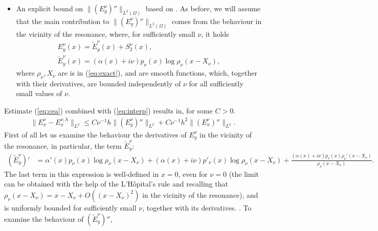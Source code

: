 \begin{itemize}
\item An explicit bound on $\|\left(E_{y}^{\nu}\right)''\|_{L^{2}(\Omega)}$ based on \cite{singular_solutions}. As before, we 
will assume that the main contribution to $\|\left(E_{y}^{\nu}\right)''\|_{L^{2}(\Omega)}$ comes from the behaviour in the vicinity of the resonance, where,
for sufficiently small $\nu$, it holds \cite[Proposition 1]{singular_solutions}
\begin{align*}
E_{y}^{\nu}(x)=\tilde{E}_{y}^{\nu}(x)+S^{\nu}_2(x), \\
\tilde{E}_{y}^{\nu}(x)=(\alpha(x)+i\nu)p_{\nu}(x)\log\rho_{\nu}(x-X_{\nu}),%
\end{align*}
where $\rho_{\nu},X_{\nu}$ are is in (\ref{eq:exact}), 
and  are smooth functions, which, together with their derivatives, are bounded independently of $\nu$ 
for all sufficiently small values of $\nu$.
\end{itemize}
Estimate (\ref{eq:cea}) combined with (\ref{eq:interp}) results in, for some $C>0$. 
\begin{align}
  \label{eq:final_est}
  \|E^{\nu}_{x}-E^{\nu,h}_{x}\|_{L^2}%
  \leq C\nu^{-1}h\|\left(E_y^{\nu}\right)''\|_{L^2}+C\nu^{-1}h^2\|\left(E_x^{\nu}\right)''\|_{L^2}.
\end{align}
First of all let us examine the behaviour the derivatives of $E_{y}^{\nu}$ in the vicinity of the resonance, 
in particular, the term $\tilde{E}_{y}^{\nu}$:
\begin{align}
\label{eq:eynuprime}
 \left(\tilde{E}_{y}^{\nu}\right)'&= \alpha'(x)p_{\nu}(x)\log\rho_{\nu}(x-X_{\nu})+(\alpha(x)+i\nu)p'_{\nu}(x)\log\rho_{\nu}(x-X_{\nu})
 +\frac{(\alpha(x)+i\nu)p_{\nu}(x)\rho_{\nu}'(x-X_{\nu})}{\rho_{\nu}(x-X_{\nu})}.
\end{align}
The last term in this expression is well-defined in $x=0$, even for $\nu=0$ (the limit can be obtained with the help of the L'Hôpital's rule 
and recalling that $\rho_{\nu}(x-X_{\nu})=x-X_{\nu}+O((x-X_{\nu})^2)$ in the vicinity of the resonance), and is uniformly bounded for sufficiently small $\nu$, together with its derivatives. 
. To examine the behaviour of $\left(\tilde{E}_{y}^{\nu}\right)''$, 
